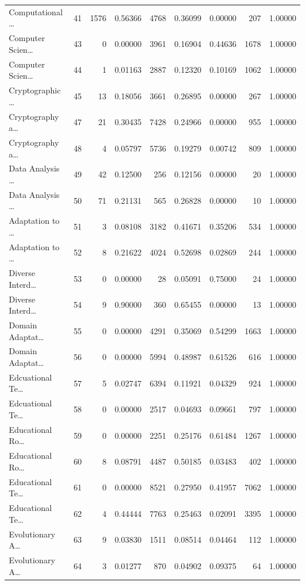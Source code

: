 \begin{table}
\begin{tabular}{lrrrrrrrr}
Computational … & 41 & 1576 & 0.56366 & 4768 & 0.36099 & 0.00000 & 207 & 1.00000 \\
Computer Scien… & 43 & 0 & 0.00000 & 3961 & 0.16904 & 0.44636 & 1678 & 1.00000 \\
Computer Scien… & 44 & 1 & 0.01163 & 2887 & 0.12320 & 0.10169 & 1062 & 1.00000 \\
Cryptographic … & 45 & 13 & 0.18056 & 3661 & 0.26895 & 0.00000 & 267 & 1.00000 \\
Cryptography a… & 47 & 21 & 0.30435 & 7428 & 0.24966 & 0.00000 & 955 & 1.00000 \\
Cryptography a… & 48 & 4 & 0.05797 & 5736 & 0.19279 & 0.00742 & 809 & 1.00000 \\
Data Analysis … & 49 & 42 & 0.12500 & 256 & 0.12156 & 0.00000 & 20 & 1.00000 \\
Data Analysis … & 50 & 71 & 0.21131 & 565 & 0.26828 & 0.00000 & 10 & 1.00000 \\
Adaptation to … & 51 & 3 & 0.08108 & 3182 & 0.41671 & 0.35206 & 534 & 1.00000 \\
Adaptation to … & 52 & 8 & 0.21622 & 4024 & 0.52698 & 0.02869 & 244 & 1.00000 \\
Diverse Interd… & 53 & 0 & 0.00000 & 28 & 0.05091 & 0.75000 & 24 & 1.00000 \\
Diverse Interd… & 54 & 9 & 0.90000 & 360 & 0.65455 & 0.00000 & 13 & 1.00000 \\
Domain Adaptat… & 55 & 0 & 0.00000 & 4291 & 0.35069 & 0.54299 & 1663 & 1.00000 \\
Domain Adaptat… & 56 & 0 & 0.00000 & 5994 & 0.48987 & 0.61526 & 616 & 1.00000 \\
Edcuational Te… & 57 & 5 & 0.02747 & 6394 & 0.11921 & 0.04329 & 924 & 1.00000 \\
Edcuational Te… & 58 & 0 & 0.00000 & 2517 & 0.04693 & 0.09661 & 797 & 1.00000 \\
Educational Ro… & 59 & 0 & 0.00000 & 2251 & 0.25176 & 0.61484 & 1267 & 1.00000 \\
Educational Ro… & 60 & 8 & 0.08791 & 4487 & 0.50185 & 0.03483 & 402 & 1.00000 \\
Educational Te… & 61 & 0 & 0.00000 & 8521 & 0.27950 & 0.41957 & 7062 & 1.00000 \\
Educational Te… & 62 & 4 & 0.44444 & 7763 & 0.25463 & 0.02091 & 3395 & 1.00000 \\
Evolutionary A… & 63 & 9 & 0.03830 & 1511 & 0.08514 & 0.04464 & 112 & 1.00000 \\
Evolutionary A… & 64 & 3 & 0.01277 & 870 & 0.04902 & 0.09375 & 64 & 1.00000 \\

\end{tabular}
\end{table}
